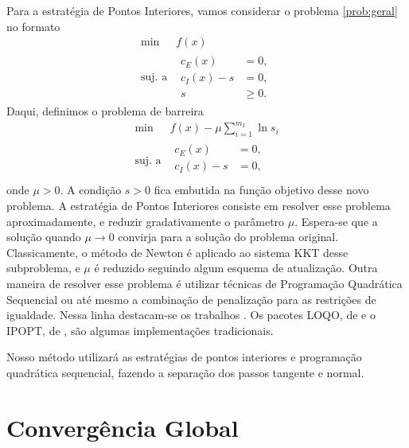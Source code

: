 Para a estratégia de Pontos Interiores, vamos considerar o problema
\eqref{prob:geral} no formato
\begin{equation*}
 \begin{array}{rl}
  \min & f(x) \\
   \mbox{suj. a} & 
   \begin{array}{rl}
     c_E(x) & =  0, \\
     c_I(x) - s & = 0, \\ 
     s & \geq 0.
   \end{array}
 \end{array}
\end{equation*}
Daqui, definimos o problema de barreira
\begin{equation*}
 \begin{array}{rl}
   \min & f(x) - \mu \displaystyle\sum_{i=1}^{m_I}\ln s_i \\
   \mbox{suj. a} & 
   \begin{array}{rl}
     c_E(x) & =  0, \\
     c_I(x) - s & = 0, \\ 
   \end{array}
 \end{array}
\end{equation*}
onde $\mu > 0$. A condição $s > 0$ fica embutida na função objetivo desse novo
problema. A estratégia de Pontos Interiores consiste em resolver esse problema
aproximadamente, e reduzir gradativamente o parâmetro $\mu$. Espera-se que a
solução quando $\mu\to0$ convirja para a solução do problema original.
Classicamente, o método de Newton é aplicado ao sistema KKT desse subproblema, e
$\mu$ é reduzido seguindo algum esquema de atualização. 
Outra maneira de resolver esse problema é utilizar técnicas de Programação Quadrática
Sequencial ou até mesmo a combinação de penalização para as restrições de
igualdade. Nessa linha destacam-se os trabalhos
\citet{bib:wright-interior, bib:wachter-interior-point, bib:byrd-interior-point,
bib:byrd-trust-region,  bib:ipopt}.
Os pacotes LOQO, de \citet{bib:loqo1,bib:loqo2} e o
IPOPT, de \citet{bib:ipopt, bib:wachter-thesis, bib:wachter-interior-point}, são
algumas implementações tradicionais.

Nosso método utilizará as estratégias de pontos interiores e programação
quadrática sequencial, fazendo a separação dos passos tangente e normal.

\section{Convergência Global}

